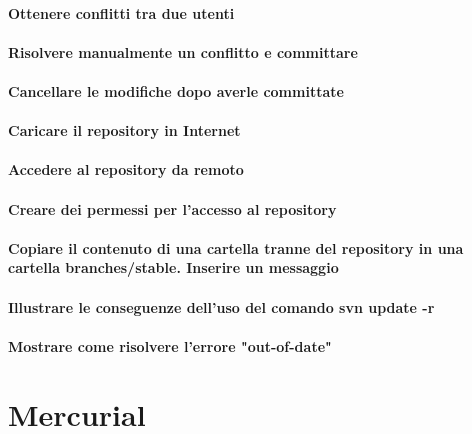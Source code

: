 \documentclass[a4paper]{article}
\begin{document}
	\paragraph{Ottenere conflitti tra due utenti}
	
	\paragraph{Risolvere manualmente un conflitto e committare}
	
	\paragraph{Cancellare le modifiche dopo averle committate}
	
	\paragraph{Caricare il repository in Internet}
	
	\paragraph{Accedere al repository da remoto}
	
	\paragraph{Creare dei permessi per l'accesso al repository}
	
	\paragraph{Copiare il contenuto di una cartella tranne del repository in una cartella branches/stable. Inserire un messaggio}
	
	\paragraph{Illustrare le conseguenze dell'uso del comando svn update -r}
	
	\paragraph{Mostrare come risolvere l'errore "out-of-date"}	
	
	
	
	\section{Mercurial} %
	
\end{document}
